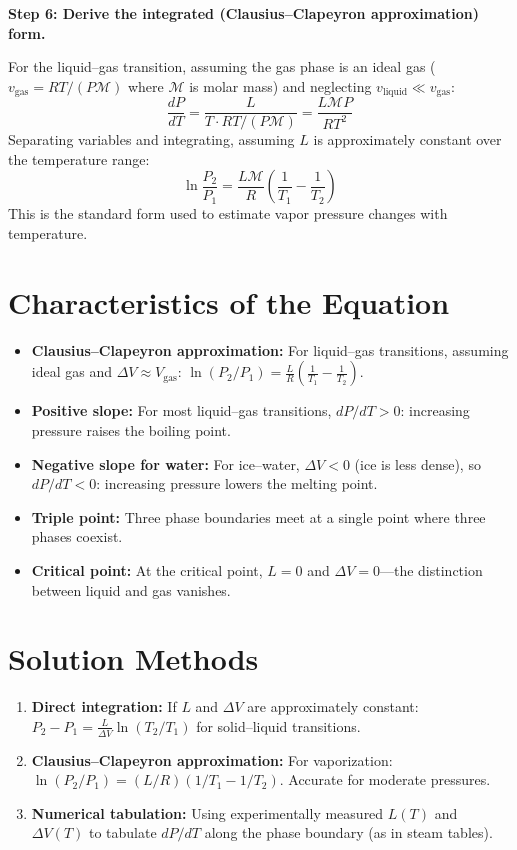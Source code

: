 \textbf{Step 6: Derive the integrated (Clausius--Clapeyron approximation) form.}

For the liquid--gas transition, assuming the gas phase is an ideal gas ($v_{\text{gas}} = RT/(P\mathcal{M})$ where $\mathcal{M}$ is molar mass) and neglecting $v_{\text{liquid}} \ll v_{\text{gas}}$:
\begin{equation}
\frac{dP}{dT} = \frac{L}{T \cdot RT/(P\mathcal{M})} = \frac{L\mathcal{M}P}{RT^2}
\end{equation}
Separating variables and integrating, assuming $L$ is approximately constant over the temperature range:
\begin{equation}
\ln\frac{P_2}{P_1} = \frac{L\mathcal{M}}{R}\left(\frac{1}{T_1} - \frac{1}{T_2}\right)
\end{equation}
This is the standard form used to estimate vapor pressure changes with temperature.

\section*{Characteristics of the Equation}

\begin{itemize}
\item \textbf{Clausius--Clapeyron approximation:} For liquid--gas transitions, assuming ideal gas and $\Delta V \approx V_{\text{gas}}$: $\ln(P_2/P_1) = \frac{L}{R}\left(\frac{1}{T_1} - \frac{1}{T_2}\right)$.
\item \textbf{Positive slope:} For most liquid--gas transitions, $dP/dT > 0$: increasing pressure raises the boiling point.
\item \textbf{Negative slope for water:} For ice--water, $\Delta V < 0$ (ice is less dense), so $dP/dT < 0$: increasing pressure lowers the melting point.
\item \textbf{Triple point:} Three phase boundaries meet at a single point where three phases coexist.
\item \textbf{Critical point:} At the critical point, $L = 0$ and $\Delta V = 0$---the distinction between liquid and gas vanishes.
\end{itemize}
\section*{Solution Methods}

\begin{enumerate}
\item \textbf{Direct integration:} If $L$ and $\Delta V$ are approximately constant: $P_2 - P_1 = \frac{L}{\Delta V} \ln(T_2/T_1)$ for solid--liquid transitions.
\item \textbf{Clausius--Clapeyron approximation:} For vaporization: $\ln(P_2/P_1) = (L/R)(1/T_1 - 1/T_2)$. Accurate for moderate pressures.
\item \textbf{Numerical tabulation:} Using experimentally measured $L(T)$ and $\Delta V(T)$ to tabulate $dP/dT$ along the phase boundary (as in steam tables).
\end{enumerate}

